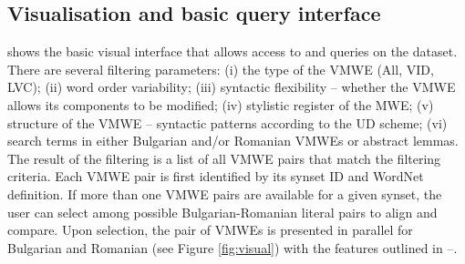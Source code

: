 \documentclass[output=paper,colorlinks,citecolor=brown]{langscibook}
\begin{document}



\subsection{Visualisation and basic query interface}


 shows the basic visual interface that allows access to and queries on the dataset. There are several filtering parameters: (i) the type of the VMWE (All, VID, LVC); (ii) word order variability; (iii) syntactic flexibility -- whether the VMWE allows its components to be modified; (iv) stylistic register of the MWE; (v) structure of the VMWE  -- syntactic patterns according to the UD scheme; (vi) search terms in either Bulgarian and/or Romanian VMWEs or abstract lemmas. The result of the filtering is a list of all VMWE pairs that match the filtering criteria. Each VMWE pair is first identified by its synset ID and WordNet definition. If more than one VMWE pairs are available for a given synset, the user can select among possible Bulgarian-Romanian literal pairs to align and compare. Upon selection, the pair of VMWEs is presented in parallel for Bulgarian and Romanian (see Figure \ref{fig:visual}) with the features outlined in --.%
\end{document}
